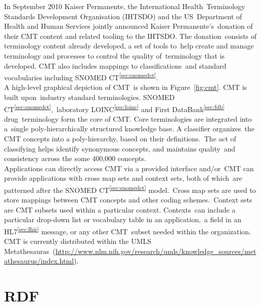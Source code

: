 \documentclass[DIV=calc, paper=a4, fontsize=12pt, onecolumn]{scrartcl}	 %
\begin{document}
  \noindent In September 2010 Kaiser Permanente, the International Health\
  Terminology Standards Development Organisation (IHTSDO) and the US\
  Department of Health and Human Services jointly announced Kaiser Permanente's\
  donation of their CMT content and related tooling to the IHTSDO. The donation\
  consists of terminology content already developed, a set of tools to\
  help create and manage terminology and processes to control the quality of\
  terminology that is developed. CMT also includes mappings to classifications\
  and standard vocabularies including SNOMED CT\textsuperscript{\ref{sec:snomedct}}.\\
  
  \noindent A high-level graphical depiction of CMT\
  is shown in Figure~\ref{fig:cmt}. CMT is built upon\
  industry standard terminologies. SNOMED CT\textsuperscript{\ref{sec:snomedct}},\
  laboratory LOINC\textsuperscript{\ref{sec:loinc}} and First DataBank\textsuperscript{\ref{sec:fdb}} drug\
  terminology form the core of CMT. Core terminologies are integrated into a\
  single poly-hierarchically structured knowledge base. A classifier organizes\
  the CMT concepts into a poly-hierarchy, based on their definitions.\
  The act of classifying helps identify synonymous concepts, and maintains quality\
  and consistency across the some 400,000 concepts.\\
  
  \noindent Applications can directly access CMT via a provided interface and/or\
  CMT can provide applications with cross map sets and context sets, both of which\
  are patterned after the SNOMED CT\textsuperscript{\ref{sec:snomedct}} model.\
  Cross map sets are used to store mappings between CMT concepts and other coding schemes.\
  Context sets are CMT subsets used within a particular context. Contexts\
  can include a particular drop-down list or vocabulary table in an application,\
  a field in an HL7\textsuperscript{\ref{sec:fhir}} message, or any other CMT\
  subset needed within the organization.\\
  
  \noindent CMT is currently distributed within the UMLS Metathesauras\
  (\url{http://www.nlm.nih.gov/research/umls/knowledge_sources/metathesaurus/index.html}).
  
  


  \section[Resource Description Framework (RDF)]{RDF}
  \label{sec:rdf}
\end{document}
